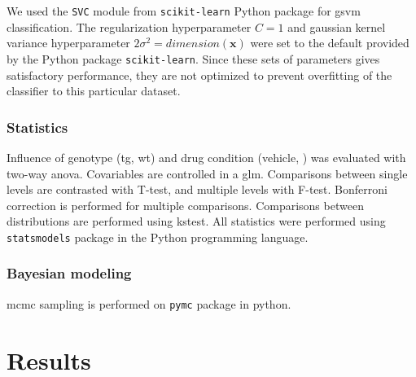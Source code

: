 We used the \texttt{SVC} module from \texttt{scikit-learn} Python package for \gls{gsvm} classification. The regularization hyperparameter $C=1$ and gaussian kernel variance hyperparameter $2\sigma^2=dimension(\mathbf{x})$ were set to the default provided by the Python package \texttt{scikit-learn}. Since these sets of parameters gives satisfactory performance, they are not optimized to prevent overfitting of the classifier to this particular dataset.



\subsubsection{Statistics}

Influence of genotype (\gls{tg}, \gls{wt}) and drug condition (vehicle, \tglu) was evaluated with two-way \gls{anova}. Covariables are controlled in a \gls{glm}. Comparisons between single levels are contrasted with T-test, and multiple levels with F-test. Bonferroni correction is performed for multiple comparisons. Comparisons between distributions are performed using \gls{kstest}. All statistics were performed using \texttt{statsmodels} package in the Python programming language.

\subsubsection{Bayesian modeling}
\gls{mcmc} sampling is performed on \texttt{pymc} package in python.


\section{Results}


